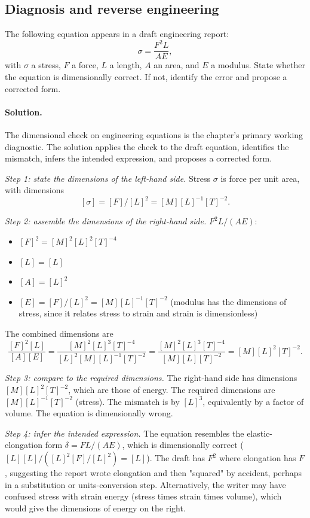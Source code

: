 \subsection*{Diagnosis and reverse engineering}

\begin{exercise}
The following equation appears in a draft engineering report:
\[
\sigma = \frac{F^{2} L}{A E},
\]
with $\sigma$ a stress, $F$ a force, $L$ a length, $A$ an area, and
$E$ a modulus. State whether the equation is dimensionally correct.
If not, identify the error and propose a corrected form.

\paragraph{Solution.}
The dimensional check on engineering equations is the chapter's
primary working diagnostic. The solution applies the check to the
draft equation, identifies the mismatch, infers the intended
expression, and proposes a corrected form.

\emph{Step 1: state the dimensions of the left-hand side.} Stress
$\sigma$ is force per unit area, with dimensions
\[
[\sigma] = [F]/[L]^{2} = [M][L]^{-1}[T]^{-2}.
\]

\emph{Step 2: assemble the dimensions of the right-hand side.}
$F^{2}L/(AE)$:
\begin{itemize}[leftmargin=*]
  \item $[F]^{2} = [M]^{2}[L]^{2}[T]^{-4}$
  \item $[L] = [L]$
  \item $[A] = [L]^{2}$
  \item $[E] = [F]/[L]^{2} = [M][L]^{-1}[T]^{-2}$ (modulus has the
    dimensions of stress, since it relates stress to strain and
    strain is dimensionless)
\end{itemize}
The combined dimensions are
\[
\frac{[F]^{2}[L]}{[A][E]} =
\frac{[M]^{2}[L]^{3}[T]^{-4}}{[L]^{2}[M][L]^{-1}[T]^{-2}} =
\frac{[M]^{2}[L]^{3}[T]^{-4}}{[M][L][T]^{-2}} = [M][L]^{2}[T]^{-2}.
\]

\emph{Step 3: compare to the required dimensions.} The right-hand
side has dimensions $[M][L]^{2}[T]^{-2}$, which are those of
energy. The required dimensions are $[M][L]^{-1}[T]^{-2}$ (stress).
The mismatch is by $[L]^{3}$, equivalently by a factor of volume.
The equation is dimensionally wrong.

\emph{Step 4: infer the intended expression.} The equation
resembles the elastic-elongation form $\delta = FL/(AE)$, which is
dimensionally correct ($[L][L]/([L]^{2}[F]/[L]^{2}) = [L]$). The
draft has $F^{2}$ where elongation has $F$, suggesting the report
wrote elongation and then "squared" by accident, perhaps in a
substitution or units-conversion step. Alternatively, the writer
may have confused stress with strain energy (stress times strain
times volume), which would give the dimensions of energy on the
right.


\end{exercise}
